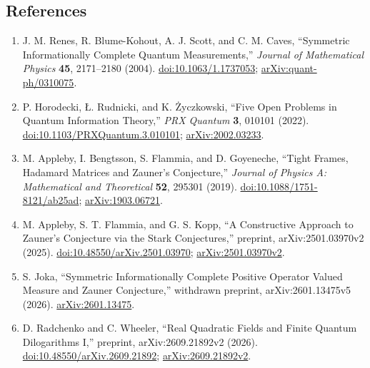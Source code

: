 \subsection*{References}

\begin{enumerate}[label={},leftmargin=4.8em,labelsep=0.5em]
  \footnotesize
  \item[\textup{[RBS+04]}]\label{ref:p17-renes-et-al}
  J. M. Renes, R. Blume-Kohout, A. J. Scott, and C. M. Caves,
  ``Symmetric Informationally Complete Quantum Measurements,''
  \emph{Journal of Mathematical Physics} \textbf{45}, 2171--2180 (2004).
  \href{https://doi.org/10.1063/1.1737053}{doi:10.1063/1.1737053};
  \href{https://arxiv.org/abs/quant-ph/0310075}{arXiv:quant-ph/0310075}.

  \item[\textup{[HRZ22]}]\label{ref:p17-horodecki-et-al}
  P. Horodecki, \L. Rudnicki, and K. \.{Z}yczkowski,
  ``Five Open Problems in Quantum Information Theory,''
  \emph{PRX Quantum} \textbf{3}, 010101 (2022).
  \href{https://doi.org/10.1103/PRXQuantum.3.010101}{doi:10.1103/PRXQuantum.3.010101};
  \href{https://arxiv.org/abs/2002.03233}{arXiv:2002.03233}.

  \item[\textup{[ABFG19]}]\label{ref:p17-appleby-et-al}
  M. Appleby, I. Bengtsson, S. Flammia, and D. Goyeneche,
  ``Tight Frames, Hadamard Matrices and Zauner's Conjecture,''
  \emph{Journal of Physics A: Mathematical and Theoretical} \textbf{52},
  295301 (2019).
  \href{https://doi.org/10.1088/1751-8121/ab25ad}{doi:10.1088/1751-8121/ab25ad};
  \href{https://arxiv.org/abs/1903.06721}{arXiv:1903.06721}.

  \item[\textup{[AFK25]}]\label{ref:p17-appleby-flammia-kopp}
  M. Appleby, S. T. Flammia, and G. S. Kopp,
  ``A Constructive Approach to Zauner's Conjecture via the Stark
  Conjectures,'' preprint, arXiv:2501.03970v2 (2025).
  \href{https://doi.org/10.48550/arXiv.2501.03970}{doi:10.48550/arXiv.2501.03970};
  \href{https://arxiv.org/abs/2501.03970v2}{arXiv:2501.03970v2}.

  \item[\textup{[Jok26]}]\label{ref:p17-joka}
  S. Joka,
  ``Symmetric Informationally Complete Positive Operator Valued Measure and
  Zauner Conjecture,'' withdrawn preprint, arXiv:2601.13475v5 (2026).
  \href{https://arxiv.org/abs/2601.13475}{arXiv:2601.13475}.

  \item[\textup{[RW26]}]\label{ref:p17-radchenko-wheeler}
  D. Radchenko and C. Wheeler,
  ``Real Quadratic Fields and Finite Quantum Dilogarithms I,''
  preprint, arXiv:2609.21892v2 (2026).
  \href{https://doi.org/10.48550/arXiv.2609.21892}{doi:10.48550/arXiv.2609.21892};
  \href{https://arxiv.org/abs/2609.21892v2}{arXiv:2609.21892v2}.


\end{enumerate}
